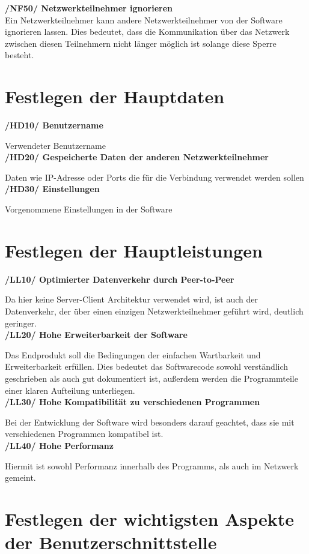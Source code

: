 \documentclass[a4paper,12pt]{scrreprt}
\begin{document}
	\textbf {/NF50/ Netzwerkteilnehmer ignorieren}
	\\Ein Netzwerkteilnehmer kann andere Netzwerkteilnehmer von der Software ignorieren lassen. Dies bedeutet, dass die Kommunikation über das Netzwerk zwischen diesen Teilnehmern nicht länger möglich ist solange diese Sperre besteht.
	
	\section{Festlegen der Hauptdaten}
	\textbf {/HD10/ Benutzername}
	
	Verwendeter Benutzername\\
	\textbf {/HD20/ Gespeicherte Daten der anderen Netzwerkteilnehmer}
	
	Daten wie IP-Adresse oder Ports die für die Verbindung verwendet werden sollen\\
	\textbf {/HD30/ Einstellungen}
	
	Vorgenommene Einstellungen in der Software\\
	
	
	\section{Festlegen der Hauptleistungen}
	
	   \textbf{/LL10/ Optimierter Datenverkehr durch Peer-to-Peer}
		
		Da hier keine Server-Client Architektur verwendet wird, ist auch der Datenverkehr, der über einen einzigen Netzwerkteilnehmer geführt wird, deutlich geringer.\\
		\textbf {/LL20/ Hohe Erweiterbarkeit der Software}
		
		Das Endprodukt soll die Bedingungen der einfachen Wartbarkeit und Erweiterbarkeit erfüllen. Dies bedeutet das Softwarecode sowohl verständlich geschrieben als auch gut dokumentiert ist, außerdem werden die Programmteile einer klaren Aufteilung unterliegen.\\
		\textbf {/LL30/ Hohe Kompatibilität zu verschiedenen Programmen}
		
		Bei der Entwicklung der Software wird besonders darauf geachtet, dass sie mit verschiedenen Programmen kompatibel ist.\\
		\textbf {/LL40/ Hohe Performanz}
		
		Hiermit ist sowohl Performanz innerhalb des Programms, als auch im Netzwerk gemeint.
		
	\section{Festlegen der wichtigsten Aspekte der Benutzerschnittstelle}
		
\end{document}
